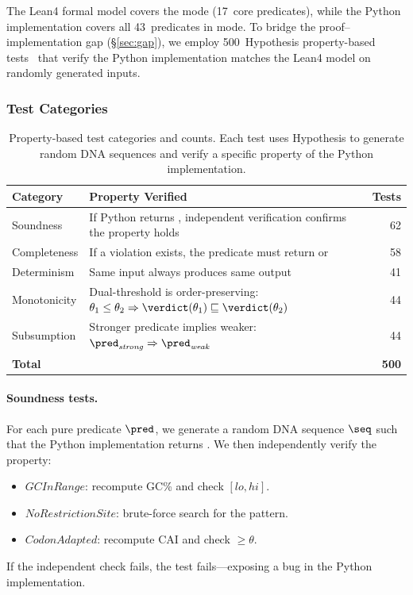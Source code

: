 The Lean4 formal model covers the \CONSERVATIVE{} mode (17~core
predicates), while the Python implementation covers all 43~predicates
in \VERIFIED{} mode.
To bridge the proof--implementation gap (\S\ref{sec:gap}), we employ
500~Hypothesis property-based tests~\cite{maciver2019hypothesis}
that verify the Python implementation matches the Lean4 model on
randomly generated inputs.

\subsubsection{Test Categories}

\begin{table}[t]
\centering
\caption{Property-based test categories and counts. Each test uses
         Hypothesis to generate random DNA sequences and verify a
         specific property of the Python implementation.}
\label{tab:pbt}
\begin{tabular}{lp{6.5cm}r}
\toprule
\textbf{Category} & \textbf{Property Verified} & \textbf{Tests} \\
\midrule
Soundness &
  If Python returns \PASS{}, independent verification confirms
  the property holds & 62 \\
Completeness &
  If a violation exists, the predicate must return \FAIL{} or
  \UNCERTAIN{} & 58 \\
Determinism &
  Same input always produces same output & 41 \\
Monotonicity &
  Dual-threshold is order-preserving:
  $\theta_1 \le \theta_2 \Rightarrow
   \verdict(\theta_1) \sqsubseteq \verdict(\theta_2)$ & 44 \\
Subsumption &
  Stronger predicate implies weaker:
  $\pred_{\mathit{strong}} \Rightarrow \pred_{\mathit{weak}}$
  & 44 \\
\midrule
\textbf{Total} & & \textbf{500} \\
\bottomrule
\end{tabular}
\end{table}

\paragraph{Soundness tests.}
For each pure predicate $\pred$, we generate a random DNA sequence
$\seq$ such that the Python implementation returns \PASS.
We then independently verify the property:
\begin{itemize}[leftmargin=*,itemsep=0pt,topsep=1pt]
\item $\mathit{GCInRange}$: recompute GC\% and check $[lo, hi]$.
\item $\mathit{NoRestrictionSite}$: brute-force search for the
      pattern.
\item $\mathit{CodonAdapted}$: recompute CAI and check $\ge \theta$.
\end{itemize}
If the independent check fails, the test fails---exposing a bug in the
Python implementation.

